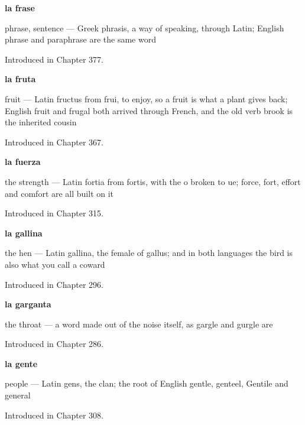 \noindent\begin{minipage}[t]{\linewidth}
\raggedright
\textbf{la frase}\par
\small phrase, sentence — Greek phrasis, a way of speaking, through Latin; English phrase and paraphrase are the same word\par
\footnotesize Introduced in Chapter 377.
\end{minipage}\par\medskip

\noindent\begin{minipage}[t]{\linewidth}
\raggedright
\textbf{la fruta}\par
\small fruit — Latin fructus from frui, to enjoy, so a fruit is what a plant gives back; English fruit and frugal both arrived through French, and the old verb brook is the inherited cousin\par
\footnotesize Introduced in Chapter 367.
\end{minipage}\par\medskip

\noindent\begin{minipage}[t]{\linewidth}
\raggedright
\textbf{la fuerza}\par
\small the strength — Latin fortia from fortis, with the o broken to ue; force, fort, effort and comfort are all built on it\par
\footnotesize Introduced in Chapter 315.
\end{minipage}\par\medskip

\noindent\begin{minipage}[t]{\linewidth}
\raggedright
\textbf{la gallina}\par
\small the hen — Latin gallina, the female of gallus; and in both languages the bird is also what you call a coward\par
\footnotesize Introduced in Chapter 296.
\end{minipage}\par\medskip

\noindent\begin{minipage}[t]{\linewidth}
\raggedright
\textbf{la garganta}\par
\small the throat — a word made out of the noise itself, as gargle and gurgle are\par
\footnotesize Introduced in Chapter 286.
\end{minipage}\par\medskip

\noindent\begin{minipage}[t]{\linewidth}
\raggedright
\textbf{la gente}\par
\small people --- Latin gens, the clan; the root of English gentle, genteel, Gentile and general\par
\footnotesize Introduced in Chapter 308.
\end{minipage}\par\medskip

